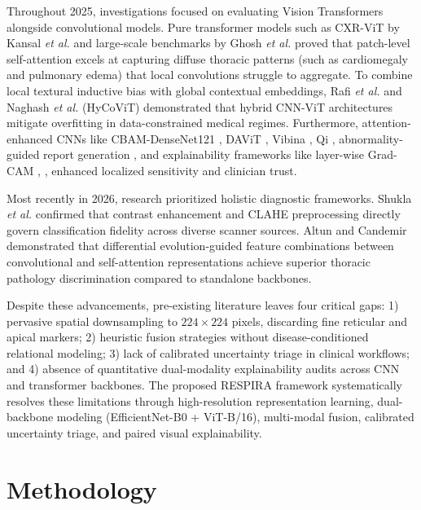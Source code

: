 \documentclass[journal]{IEEEtran}
\begin{document}
Throughout 2025, investigations focused on evaluating Vision Transformers alongside convolutional models. Pure transformer models such as CXR-ViT by Kansal \textit{et al.} \cite{kansal2025cxr} and large-scale benchmarks by Ghosh \textit{et al.} \cite{ghosh2025vision} proved that patch-level self-attention excels at capturing diffuse thoracic patterns (such as cardiomegaly and pulmonary edema) that local convolutions struggle to aggregate. To combine local textural inductive bias with global contextual embeddings, Rafi \textit{et al.} \cite{rafi2025chest} and Naghash \textit{et al.} \cite{naghash2025hycovit} (HyCoViT) demonstrated that hybrid CNN-ViT architectures mitigate overfitting in data-constrained medical regimes. Furthermore, attention-enhanced CNNs like CBAM-DenseNet121 \cite{dey2025cbam}, DAViT \cite{fu2025davit}, Vibina \cite{vibina2025deep}, Qi \cite{qi2025attention}, abnormality-guided report generation \cite{edirisinghe2025abnormality}, and explainability frameworks like layer-wise Grad-CAM \cite{pandit2025explainable}, \cite{kim2025explainable}, \cite{pabba2025explainable} enhanced localized sensitivity and clinician trust.

Most recently in 2026, research prioritized holistic diagnostic frameworks. Shukla \textit{et al.} \cite{shukla2026chest} confirmed that contrast enhancement and CLAHE preprocessing directly govern classification fidelity across diverse scanner sources. Altun and Candemir \cite{altun2026differential} demonstrated that differential evolution-guided feature combinations between convolutional and self-attention representations achieve superior thoracic pathology discrimination compared to standalone backbones.

Despite these advancements, pre-existing literature leaves four critical gaps: 1) pervasive spatial downsampling to $224 \times 224$ pixels, discarding fine reticular and apical markers; 2) heuristic fusion strategies without disease-conditioned relational modeling; 3) lack of calibrated uncertainty triage in clinical workflows; and 4) absence of quantitative dual-modality explainability audits across CNN and transformer backbones. The proposed RESPIRA framework systematically resolves these limitations through high-resolution representation learning, dual-backbone modeling (EfficientNet-B0 + ViT-B/16), multi-modal fusion, calibrated uncertainty triage, and paired visual explainability.

\section{Methodology}
\label{sec:methodology}
\end{document}
